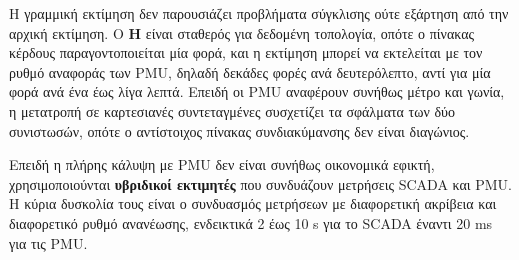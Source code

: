 Η γραμμική εκτίμηση δεν παρουσιάζει προβλήματα σύγκλισης ούτε εξάρτηση από την αρχική
εκτίμηση. Ο $\mathbf{H}$ είναι σταθερός για δεδομένη τοπολογία, οπότε ο πίνακας κέρδους
παραγοντοποιείται μία φορά, και η εκτίμηση μπορεί να εκτελείται με τον ρυθμό αναφοράς των
PMU, δηλαδή δεκάδες φορές ανά δευτερόλεπτο, αντί για μία φορά ανά ένα έως λίγα λεπτά. Επειδή
οι PMU αναφέρουν συνήθως μέτρο και γωνία, η μετατροπή σε καρτεσιανές συντεταγμένες συσχετίζει
τα σφάλματα των δύο συνιστωσών, οπότε ο αντίστοιχος πίνακας συνδιακύμανσης δεν είναι
διαγώνιος.

Επειδή η πλήρης κάλυψη με PMU δεν είναι συνήθως οικονομικά εφικτή, χρησιμοποιούνται
\textbf{υβριδικοί εκτιμητές} που συνδυάζουν μετρήσεις SCADA και PMU. Η κύρια δυσκολία τους
είναι ο συνδυασμός μετρήσεων με διαφορετική ακρίβεια και διαφορετικό ρυθμό ανανέωσης,
ενδεικτικά 2 έως 10 s για το SCADA έναντι 20 ms για τις PMU.
